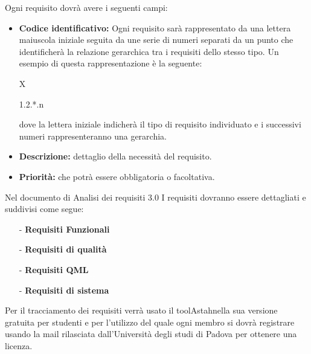 \documentclass[a4paper,11pt]{article}
\begin{document}
			Ogni requisito dovrà avere i seguenti campi:
			\begin{itemize}
			\item \textbf{Codice identificativo:} 
			Ogni requisito sarà rappresentato da una lettera maiuscola iniziale seguita da une serie di numeri separati da un punto che identificherà la relazione gerarchica tra i requisiti dello stesso tipo. Un esempio di questa rappresentazione è la seguente:
					\begin{center}
					\begin{Large} X\end{Large}  \begin{normalsize}1.2.*.n	\end{normalsize}					
					\end{center}
					dove la lettera iniziale indicherà il tipo di requisito individuato e i successivi numeri rappresenteranno una gerarchia.					
			
			\item \textbf{Descrizione:} dettaglio della necessità del requisito.
			\item \textbf{Priorità:} che potrà essere obbligatoria o facoltativa.
			\end{itemize}
			Nel documento di Analisi dei requisiti 3.0
			I requisiti dovranno essere dettagliati  e suddivisi come segue:
			\begin{itemize}
			\item[-] \textbf{Requisiti Funzionali}
			\item[-] \textbf{Requisiti di qualità}
			\item[-] \textbf{Requisiti QML}
			\item[-] \textbf{Requisiti di sistema}
			\end{itemize}

	
			Per il tracciamento dei requisiti verrà usato il tool\addglos Astah\addglos nella sua versione gratuita per studenti e per l'utilizzo del quale ogni membro si dovrà registrare usando la mail rilasciata dall'Università degli studi di Padova per ottenere una licenza.  
			
\end{document}

